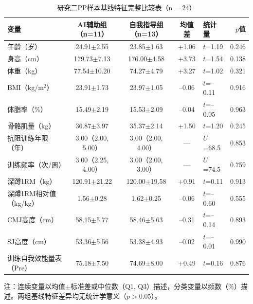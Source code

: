 \begin{landscape}
\thispagestyle{empty}
\begin{table}[htbp]
\centering
\caption{研究二PP样本基线特征完整比较表（n = 24）}
\label{tab:app_baseline_full}
\begin{threeparttable}
\begin{tabular}{lccclr}
\toprule
变量 & AI辅助组（n=11） & 自我指导组（n=13） & 均值差 & 统计量 & $p$值 \\
\midrule
年龄（岁） & 24.91$\pm$2.55 & 23.85$\pm$1.63 & +1.06 & $t$=1.19 & 0.246 \\
身高（cm） & 179.73$\pm$7.13 & 176.00$\pm$4.58 & +3.73 & $t$=1.54 & 0.138 \\
体重（kg） & 77.54$\pm$10.20 & 74.27$\pm$4.79 & +3.27 & $t$=1.02 & 0.321 \\
BMI（kg/m$^2$） & 23.91$\pm$1.73 & 23.97$\pm$1.05 & --0.06 & $t$=--0.11 & 0.916 \\
体脂率（\%） & 15.49$\pm$2.19 & 15.53$\pm$2.09 & --0.04 & $t$=--0.05 & 0.963 \\
骨骼肌量（kg） & 36.87$\pm$3.97 & 35.37$\pm$2.14 & +1.50 & $t$=1.20 & 0.245 \\
抗阻训练年限（年） & 3.00（2.00, 5.00） & 3.00（2.00, 4.00） & --- & $U$=68.5 & 0.853 \\
训练频率（次/周） & 3.00（2.25, 4.00） & 3.00（2.00, 3.00） & --- & $U$=74.5 & 0.759 \\
深蹲1RM（kg） & 120.91$\pm$21.22 & 120.00$\pm$19.58 & +0.91 & $t$=0.11 & 0.913 \\
深蹲1RM相对值（kg/kg） & 1.56$\pm$0.28 & 1.62$\pm$0.25 & --0.06 & $t$=--0.60 & 0.555 \\
CMJ高度（cm） & 58.15$\pm$5.77 & 58.46$\pm$5.63 & --0.31 & $t$=--0.14 & 0.893 \\
SJ高度（cm） & 53.36$\pm$5.56 & 53.38$\pm$4.93 & --0.02 & $t$=--0.01 & 0.990 \\
训练自我效能量表（Pre） & 75.18$\pm$7.50 & 74.69$\pm$8.00 & +0.49 & $t$=0.16 & 0.876 \\
\bottomrule
\end{tabular}
\begin{tablenotes}[flushleft]\footnotesize
\item 注：连续变量以均值$\pm$标准差或中位数（Q1, Q3）描述，分类变量以频数（\%）描述。两组基线特征差异均无统计学意义（$p>$0.05）。
\end{tablenotes}
\end{threeparttable}
\end{table}
\end{landscape}

